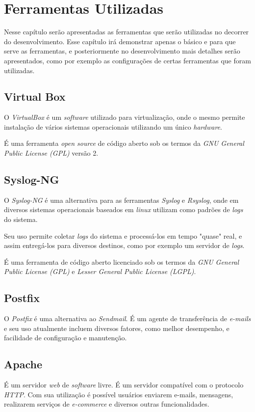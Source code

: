 \section{Ferramentas Utilizadas}
Nesse capítulo serão apresentadas as ferramentas que serão utilizadas no decorrer do desenvolvimento. Esse capítulo irá demonstrar apenas o básico e para que serve as ferramentas, e posteriormente no desenvolvimento mais detalhes serão apresentados, como por exemplo as configurações de certas ferramentas que foram utilizadas.

\subsection{Virtual Box}
O \textit{VirtualBox} é um \textit{software} utilizado para virtualização, onde o mesmo permite instalação de vários sistemas operacionais utilizando um único \textit{hardware}.

É uma ferramenta \textit{open source} de código aberto sob os termos da \textit{GNU General Public License (GPL)} versão 2. 

\subsection{Syslog-NG}
O \textit{Syslog-NG} é uma alternativa para as ferramentas \textit{Syslog} e \textit{Rsyslog}, onde em diversos sistemas operacionais baseados em \textit{linux} utilizam como padrões de \textit{logs} do sistema.

Seu uso permite coletar \textit{logs} do sistema e processá-los em tempo "quase" real, e assim entregá-los para diversos destinos, como por exemplo um servidor de \textit{logs}.

É uma ferramenta de código aberto licenciado sob os termos da \textit{GNU General Public License (GPL)} e \textit{Lesser General Public License (LGPL)}.

\subsection{Postfix}
O \textit{Postfix} é uma alternativa ao \textit{Sendmail}. É um agente de transferência de \textit{e-mails} e seu uso atualmente incluem diversos fatores, como melhor desempenho, e facilidade de configuração e manutenção.

\subsection{Apache}
É um servidor \textit{web} de \textit{software} livre.  É um servidor compatível com o protocolo \textit{HTTP}. Com sua utilização é possível usuários enviarem e-mails, mensagens, realizarem serviços de \textit{e-commerce} e diversos outras funcionalidades. 

